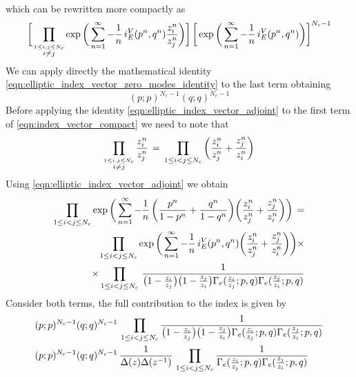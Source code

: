 \begin{appendices}
\begin{equation}
\begin{aligned}
\end{aligned}
\end{equation}
which can be rewritten more compactly as
\begin{equation}
\bigg[\prod_{\overset{ 1 \leq i,j \leq N_c}{i\neq j}} \exp \bigg( \sum_{n=1}^{\infty} - {1 \over n} \, i_E^V(p^n,q^n)  {z_i^n \over z_j^n}\bigg) \bigg] \,
\bigg[ \exp \bigg( \sum_{n=1}^{\infty} - {1 \over n} \,  i_E^V(p^n,q^n) \bigg) \bigg] ^{N_c-1}
\label{eqn:index_vector_compact}
\end{equation}
We can apply directly the mathematical identity \eqref{eqn:elliptic_index_vector_zero_modes_identity} to the last term obtaining
$$
	(p;p)^{N_c-1} ( q;q)^{N_c-1}
$$
Before applying the identity \eqref{eqn:elliptic_index_vector_adjoint} to the first term of  \eqref{eqn:index_vector_compact} we need to note that 
$$
 \prod_{ \overset{ 1 \leq i,j \leq N_c}{ i\neq j }} {z_i^n \over z_j^n} \,  = \,
  \prod_{ 1 \leq i < j \leq N_c}\bigg( {z_i^n \over z_j^n} + {z_j^n \over z_i^n}   \bigg)
 $$
Using \eqref{eqn:elliptic_index_vector_adjoint} we obtain
\begin{align*}
\prod_{ 1 \leq i < j \leq N_c} \exp \bigg( \sum_{n=1}^{\infty} - {1 \over n} \, \bigg( {p^n \over 1-p^n} + {q^n \over 1-q^n} \bigg)  \bigg( {z_i^n \over z_j^n} + {z_j^n \over z_i^n}\bigg) \bigg) \, =\\
\prod_{ 1 \leq i < j \leq N_c} \exp \bigg( \sum_{n=1}^{\infty} - {1 \over n} \, i_E^V(p^n,q^n)  \bigg( {z_i^n \over z_j^n} + {z_j^n \over z_i^n}\bigg) \bigg) \times
\\
\times  \prod_{ 1 \leq i < j \leq N_c}   \, \frac{ 1 } { \big( 1 -{ z_i \over z_j} \big) \big ( 1 - { z_j \over z_i} \big) \Gamma_e( {z_i \over z_j};p,q) \Gamma_e({z_j \over z_i}; p,q)  }
\end{align*}
Consider both terms, the full contribution to the index is given by  \begin{align*}
& (p;p)^{N_c-1} ( q;q)^{N_c-1} \, \prod_{ 1 \leq i < j \leq N_c} \frac{ 1 }{ \big( 1 -{ z_i \over z_j} \big) \big ( 1 - { z_j \over z_i} \big) \Gamma_e( {z_i \over z_j};p,q) \Gamma_e({z_j \over z_i}; p,q)  } \\
& (p;p)^{N_c-1} ( q;q)^{N_c-1} \, \frac{1}{ \Delta(z) \Delta (z^{-1})} \, \prod_{ 1 \leq i < j \leq N_c} \frac{ 1 }{ \Gamma_e( {z_i \over z_j};p,q) \Gamma_e({z_j \over z_i}; p,q)}
\end{align*}





\end{appendices}
